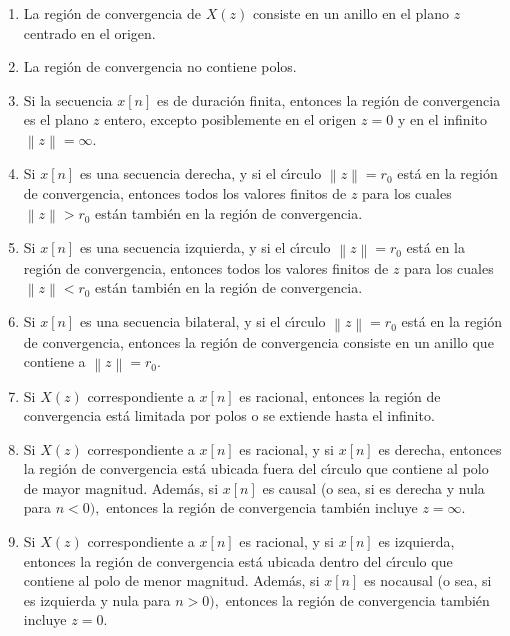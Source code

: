 \begin{enumerate}
\item  La regi\'{o}n de convergencia de $X\left( z\right) $ consiste en un
anillo en el plano $z$ centrado en el origen.

\item  La regi\'{o}n de convergencia no contiene polos.

\item  Si la secuencia $x\left[ n\right] $ es de duraci\'{o}n finita,
entonces la regi\'{o}n de convergencia es el plano $z$ entero, excepto
posiblemente en el origen $z=0$ y en el infinito $\left\| z \right\|=\infty$.

\item  Si $x\left[ n\right] $ es una secuencia derecha, y si el c\'{\i}rculo 
$\left\| z\right\| =r_{0}$ est\'{a} en la regi\'{o}n de convergencia,
entonces todos los valores finitos de $z$ para los cuales $\left\| z\right\|>r_{0}$ 
est\'{a}n tambi\'{e}n en la regi\'{o}n de convergencia.

\item  Si $x\left[ n\right] $ es una secuencia izquierda, y si el
c\'{\i}rculo $\left\| z\right\| =r_{0}$ est\'{a} en la regi\'{o}n de
convergencia, entonces todos los valores finitos de $z$ para los cuales 
$\left\| z\right\| <r_{0}$ est\'{a}n tambi\'{e}n en la regi\'{o}n de
convergencia.

\item  Si $x\left[ n\right] $ es una secuencia bilateral, y si el
c\'{\i}rculo $\left\| z\right\| =r_{0}$ est\'{a} en la regi\'{o}n de
convergencia, entonces la regi\'{o}n de convergencia consiste en un anillo
que contiene a $\left\| z\right\| =r_{0}$.

\item  Si $X\left( z\right) $ correspondiente a $x\left[ n\right] $ es
racional, entonces la regi\'{o}n de convergencia est\'{a} limitada por polos
o se extiende hasta el infinito.

\item  Si $X\left( z\right) $ correspondiente a $x\left[ n\right] $ es
racional, y si $x\left[ n\right] $ es derecha, entonces la regi\'{o}n de
convergencia est\'{a} ubicada fuera del c\'{\i}rculo que contiene al polo de
mayor magnitud. Adem\'{a}s, si $x\left[ n\right] $ es causal (o sea, si es
derecha y nula para $n<0),$ entonces la regi\'{o}n de convergencia
tambi\'{e}n incluye $z=\infty .$

\item  Si $X\left( z\right) $ correspondiente a $x\left[ n\right] $ es
racional, y si $x\left[ n\right] $ es izquierda, entonces la regi\'{o}n de
convergencia est\'{a} ubicada dentro del c\'{\i}rculo que contiene al polo de
menor magnitud. Adem\'{a}s, si $x\left[ n\right] $ es nocausal (o sea, si es
izquierda y nula para $n>0),$ entonces la regi\'{o}n de convergencia
tambi\'{e}n incluye $z=0$.
\end{enumerate}

